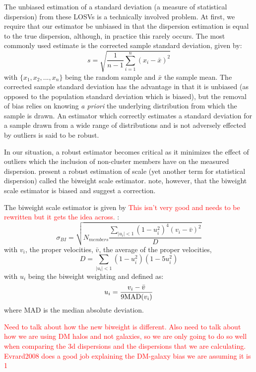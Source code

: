 \documentclass[apj, revtex4]{emulateapj}
\newcommand{\editorial}[1]{\textcolor{red}{#1} }
\begin{document}
The unbiased estimation of a standard deviation (a measure of statistical dispersion) from these LOSVs is a technically involved problem. At first, we require that our estimator be unbiased in that the dispersion estimation is equal to the true dispersion, although, in practice this rarely occurs. The most commonly used estimate is the corrected sample standard deviation, given by:
\begin{equation}
	s = \sqrt{\frac{1}{n-1} \sum_{i=1}^n (x_i - \bar{x})^2}
\end{equation}
with $\{x_1, x_2, ..., x_n\}$ being the random sample and $\bar{x}$ the sample mean. The corrected sample standard deviation has the advantage in that it is unbiased (as opposed to the population standard deviation which is biased), but the removal of bias relies on knowing \textit{a priori} the underlying distribution from which the sample is drawn. An estimator which correctly estimates a standard deviation for a sample drawn from a wide range of distributions and is not adversely effected by outliers is said to be robust.

In our situation, a robust estimator becomes critical as it minimizes the effect of outliers which the inclusion of non-cluster members have on the measured dispersion. \cite{Beers1990} present a robust estimation of scale (yet another term for statistical dispersion) called the biweight scale estimator. \cite{Ruel2014} note, however, that the biweight scale estimator is biased and suggest a correction. 

The biweight scale estimator is given by \editorial{This isn't very good and needs to be rewritten but it gets the idea across.}:
\begin{equation}
	\sigma_{BI} = \sqrt{ N_{members} \frac{ \sum_{|u_i|<1} (1-u_i^2)^4 (v_i - \bar{v})^2} {D} }
\end{equation}
with $v_i$, the proper velocities, $\bar{v}$, the average of the proper velocities,
\begin{equation}
	D = \sum_{|u_i|<1} (1-u_i^2)(1-5u_i^2)
\end{equation}
with $u_i$ being the biweight weighting and defined as:
\begin{equation}
	u_i = \frac{v_i - \bar{v}}{9 {\rm MAD}(v_i)}
\end{equation}
where MAD is the median absolute deviation.

\editorial{Need to talk about how the new biweight is different. Also need to talk about how we are using DM halos and not galaxies, so we are only going to do so well when comparing the 3d dispersions and the dispersions that we are calculating. Evrard2008 does a good job explaining the DM-galaxy bias we are assuming it is 1}
\end{document}
